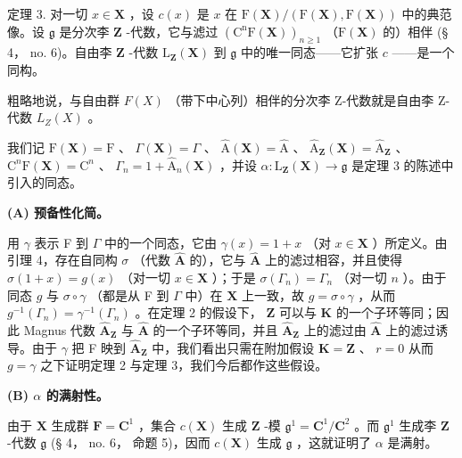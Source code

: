 定理 3. 对一切 \(x \in \mathbf{X}\) ，设 \(c(x)\) 是 \(x\) 在 \(\mathrm{F}(\mathbf{X}) / (\mathrm{F}(\mathbf{X}), \mathrm{F}(\mathbf{X}))\) 中的典范像。设 \(\mathfrak{g}\) 是分次李 \(\mathbf{Z}\) -代数，它与滤过 \((\mathrm{C}^{\mathrm{n}}\mathrm{F}(\mathbf{X}))_{n \geqslant 1}\) （\(\mathrm{F}(\mathbf{X})\) 的）相伴 (§ 4， no. 6)。自由李 \(\mathbf{Z}\) -代数 \(\mathrm{L}_{\mathbf{Z}}(\mathbf{X})\) 到 \(\mathfrak{g}\) 中的唯一同态——它扩张 \(c\) ——是一个同构。

粗略地说，与自由群 \(F(X)\) （带下中心列）相伴的分次李 Z-代数就是自由李 Z-代数 \(L_{Z}(X)\) 。

我们记 \(\mathrm{F}(\mathbf{X}) = \mathrm{F}\) 、 \(\Gamma(\mathbf{X}) = \Gamma\) 、 \(\hat{\mathrm{A}}(\mathbf{X}) = \hat{\mathrm{A}}\) 、 \(\hat{\mathrm{A}}_{\mathbf{Z}}(\mathbf{X}) = \hat{\mathrm{A}}_{\mathbf{Z}}\) 、 \(\mathrm{C}^n\mathrm{F}(\mathbf{X}) = \mathrm{C}^n\) 、 \(\Gamma_n = 1 + \hat{\mathrm{A}}_n(\mathbf{X})\) ，并设 \(\alpha: \mathrm{L}_{\mathbf{Z}}(\mathbf{X}) \to \mathfrak{g}\) 是定理 3 的陈述中引入的同态。

\textbf{(A) 预备性化简。}

用 \(\gamma\) 表示 F 到 \(\Gamma\) 中的一个同态，它由 \(\gamma(x) = 1 + x\) （对 \(x \in \mathbf{X}\) ）所定义。由引理 4，存在自同构 \(\sigma\) （代数 \(\hat{\mathbf{A}}\) 的），它与 \(\hat{\mathbf{A}}\) 上的滤过相容，并且使得 \(\sigma(1 + x) = g(x)\) （对一切 \(x \in \mathbf{X}\) ）；于是 \(\sigma(\Gamma_n) = \Gamma_n\) （对一切 \(n\) ）。由于同态 \(g\) 与 \(\sigma \circ \gamma\) （都是从 F 到 \(\Gamma\) 中）在 \(\mathbf{X}\) 上一致，故 \(g = \sigma \circ \gamma\) ，从而 \(g^{-1}(\Gamma_n) = \gamma^{-1}(\Gamma_n)\) 。在定理 2 的假设下， \(\mathbf{Z}\) 可以与 \(\mathbf{K}\) 的一个子环等同；因此 Magnus 代数 \(\hat{\mathbf{A}}_{\mathbf{Z}}\) 与 \(\hat{\mathbf{A}}\) 的一个子环等同，并且 \(\hat{\mathbf{A}}_{\mathbf{Z}}\) 上的滤过由 \(\hat{\mathbf{A}}\) 上的滤过诱导。由于 \(\gamma\) 把 F 映到 \(\hat{\mathbf{A}}_{\mathbf{Z}}\) 中，我们看出只需在附加假设 \(\mathbf{K} = \mathbf{Z}\) 、 \(r = 0\) 从而 \(g = \gamma\) 之下证明定理 2 与定理 3，我们今后都作这些假设。

\textbf{(B) \(\alpha\) 的满射性。}

由于 \(\mathbf{X}\) 生成群 \(\mathbf{F} = \mathbf{C}^1\) ，集合 \(c(\mathbf{X})\) 生成 \(\mathbf{Z}\) -模 \(\mathfrak{g}^1 = \mathbf{C}^1 / \mathbf{C}^2\) 。而 \(\mathfrak{g}^1\) 生成李 \(\mathbf{Z}\) -代数 \(\mathfrak{g}\) (§ 4， no. 6， 命题 5)，因而 \(c(\mathbf{X})\) 生成 \(\mathfrak{g}\) ，这就证明了 \(\alpha\) 是满射。

